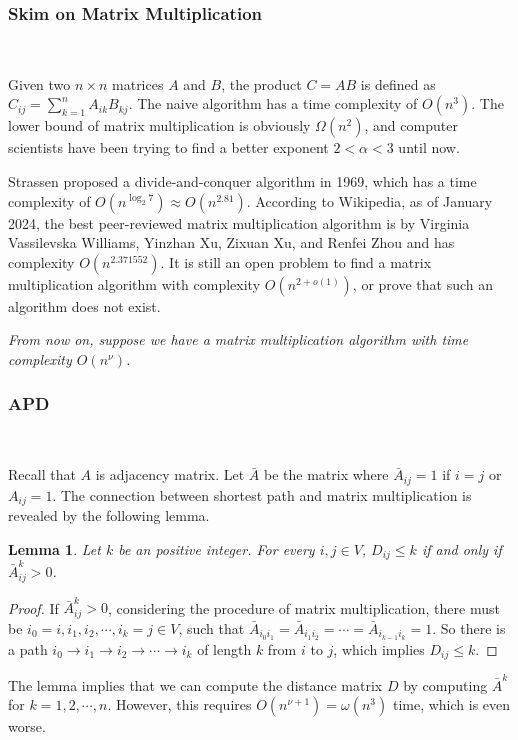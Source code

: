 \documentclass[12pt]{article}
\newtheorem{lemma}{Lemma}
\begin{document}
\subsubsection{Skim on Matrix Multiplication}\

Given two $n\times n$ matrices $A$ and $B$, the product $C=AB$ is defined as $C_{ij}=\sum_{k=1}^n A_{ik}B_{kj}$. The naive algorithm has a time complexity of $O(n^3)$. The lower bound of matrix multiplication is obviously $\Omega(n^2)$, and computer scientists have been trying to find a better exponent $2<\alpha<3$ until now.

Strassen proposed a divide-and-conquer algorithm in 1969, which has a time complexity of $O(n^{\log_2 7})\approx O(n^{2.81})$. According to Wikipedia, as of January 2024, the best peer-reviewed matrix multiplication algorithm is by Virginia Vassilevska Williams, Yinzhan Xu, Zixuan Xu, and Renfei Zhou and has complexity $O(n^{2.371552})$. It is still an open problem to find a matrix multiplication algorithm with complexity $O(n^{2+o(1)})$, or prove that such an algorithm does not exist.

\emph{From now on, suppose we have a matrix multiplication algorithm with time complexity $O(n^\nu)$.}

\subsubsection{APD}\

Recall that $A$ is adjacency matrix. Let $\bar{A}$ be the matrix where $\bar{A}_{ij}=1$ if $i=j$ or $A_{ij}=1$. The connection between shortest path and matrix multiplication is revealed by the following lemma.
\begin{lemma}
    \label{lemma:shortest_path_matrix_multiplication}
    Let $k$ be an positive integer. For every $i,j\in V$, $D_{ij}\le k$ if and only if $\bar{A}^k_{ij}>0$.
\end{lemma}
\begin{proof}
If $\bar{A}^k_{ij}>0$, considering the procedure of matrix multiplication, there must be $i_0=i,i_1,i_2,\cdots,i_k=j\in V$, such that $\bar A_{i_0i_1}=\bar A_{i_1i_2}=\cdots=\bar A_{i_{k-1}i_k}=1$. So there is a path $i_0\to i_1\to i_2\to\cdots\to i_k$ of length $k$ from $i$ to $j$, which implies $D_{ij}\le k$.
\end{proof}

The lemma implies that we can compute the distance matrix $D$ by computing $\bar{A}^k$ for $k=1,2,\cdots,n$. However, this requires $O(n^{\nu+1})=\omega(n^3)$ time, which is even worse.
\end{document}
